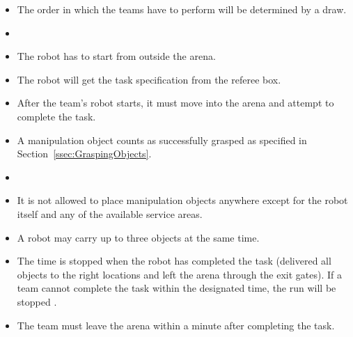 \begin{itemize}
\item The order in which the teams have to perform will be determined by a draw.
\item {}
\item The robot has to start from outside the arena.
\item The robot will get the task specification from the referee box.
\item After the team’s robot starts, it must move into the arena and attempt to complete the task. 
\item A manipulation object counts as successfully grasped as specified in Section~\ref{ssec:GraspingObjects}.
\item {}
\item It is not allowed to place manipulation objects anywhere except for the robot itself and any of the available service areas.
\item A robot may carry up to three objects at the same time.
\item The time is stopped when the robot has completed the task (delivered all objects to the right locations and left the arena through the exit gates). If a team cannot complete the task within  the designated time, the run will be stopped . 
\item The team must leave the arena within a minute after completing the task.
\end{itemize}


%
%
%
